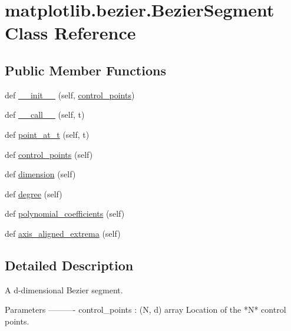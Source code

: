 \hypertarget{classmatplotlib_1_1bezier_1_1BezierSegment}{}\section{matplotlib.\+bezier.\+Bezier\+Segment Class Reference}
\label{classmatplotlib_1_1bezier_1_1BezierSegment}
\subsection*{Public Member Functions}
\begin{DoxyCompactItemize}
\item 
def \hyperlink{classmatplotlib_1_1bezier_1_1BezierSegment_a3a6a4a99aa520e1366c19394741340ed}{\+\_\+\+\_\+init\+\_\+\+\_\+} (self, \hyperlink{classmatplotlib_1_1bezier_1_1BezierSegment_a778feb95e384072e6acf9e9061bce219}{control\+\_\+points})
\item 
def \hyperlink{classmatplotlib_1_1bezier_1_1BezierSegment_a39f09d363b546d8ff4986a616f99de4c}{\+\_\+\+\_\+call\+\_\+\+\_\+} (self, t)
\item 
def \hyperlink{classmatplotlib_1_1bezier_1_1BezierSegment_a8094d563138d2857d8c3eab363b384bc}{point\+\_\+at\+\_\+t} (self, t)
\item 
def \hyperlink{classmatplotlib_1_1bezier_1_1BezierSegment_a778feb95e384072e6acf9e9061bce219}{control\+\_\+points} (self)
\item 
def \hyperlink{classmatplotlib_1_1bezier_1_1BezierSegment_abc54046b83c993c784cc321a1eb37542}{dimension} (self)
\item 
def \hyperlink{classmatplotlib_1_1bezier_1_1BezierSegment_a3ac8fcbc3b6cb71f4f0d893f52e7765b}{degree} (self)
\item 
def \hyperlink{classmatplotlib_1_1bezier_1_1BezierSegment_a6a13b2b879af5d5622c71bf197846351}{polynomial\+\_\+coefficients} (self)
\item 
def \hyperlink{classmatplotlib_1_1bezier_1_1BezierSegment_ac9649690bbcd4e1ee8868a63a679a25b}{axis\+\_\+aligned\+\_\+extrema} (self)
\end{DoxyCompactItemize}


\subsection{Detailed Description}
\begin{DoxyVerb}A d-dimensional Bezier segment.

Parameters
----------
control_points : (N, d) array
    Location of the *N* control points.
\end{DoxyVerb}
 

